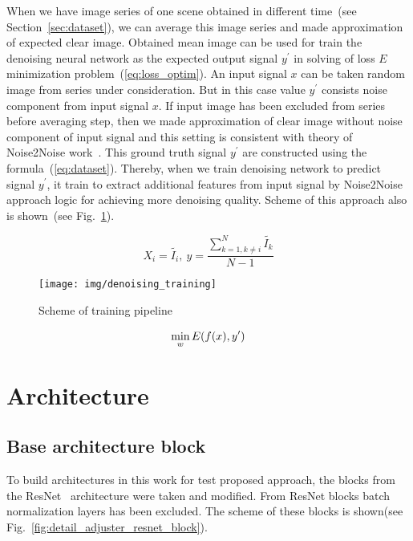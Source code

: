\documentclass[runningheads]{llncs}
\begin{document}
When we have image series of one scene obtained in different time~(see Section~\ref{sec:dataset}), we can average this image series and made approximation of expected clear image. Obtained mean image can be used for train the denoising neural network as the expected output signal $y^\prime$ in solving of loss $E$ minimization problem~(\ref{eq:loss_optim}). An input signal $x$ can be taken random image from series under consideration. But in this case value $y^\prime$ consists noise component from input signal $x$. If input image has been excluded from series before averaging step, then we made approximation of clear image without noise component of input signal and this setting is consistent with theory of Noise2Noise work~\cite{noise2noise_paper}. This ground truth signal $y^\prime$ are constructed using the formula~(\ref{eq:dataset}). Thereby, when we train denoising network to predict signal $y^\prime$, it train to extract additional features from input signal by Noise2Noise approach logic for achieving more denoising quality.
Scheme of this approach also is shown~(see Fig.~\ref{fig:denoising_training}).

\begin{equation}\label{eq:dataset}
X_i = \tilde{I_i},\ y = \frac{\sum_{k=1, k \ne i}^{N}\tilde{I_k}}{N - 1}
\end{equation}

\begin{figure}
	\centering
	\texttt{[image: img/denoising\_training]}
	\caption{Scheme of training pipeline}
	\label{fig:denoising_training}
\end{figure}

\begin{eqnarray}\label{eq:loss_optim}
\min_{\mathnormal{w}} E(f(x), y^\prime)
\end{eqnarray}

\section{Architecture}

\subsection{Base architecture block}

To build architectures in this work for test proposed approach, the blocks from the ResNet~\cite{resnet_paper} architecture were taken and modified. From ResNet blocks batch normalization layers has been excluded. The scheme of these blocks is shown(see Fig.~\ref{fig:detail_adjuster_resnet_block}).
\end{document}
